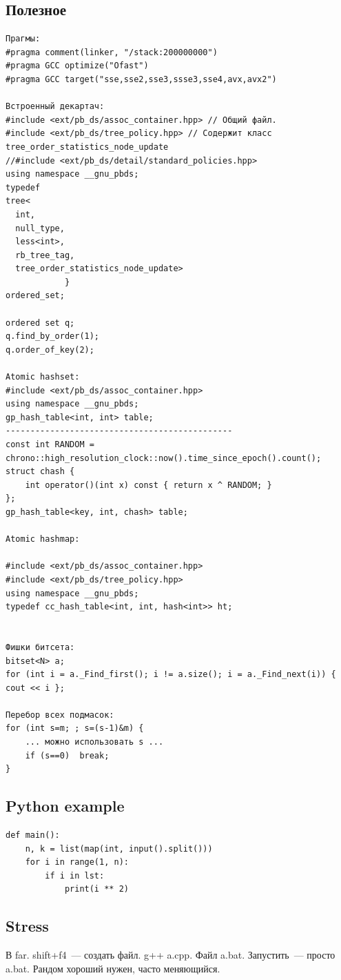 \documentclass[10pt, portrait,letterpaper]{article}
\begin{document}
\subsection{Полезное}
\begin{verbatim}
Прагмы:
#pragma comment(linker, "/stack:200000000")
#pragma GCC optimize("Ofast")
#pragma GCC target("sse,sse2,sse3,ssse3,sse4,avx,avx2")

Встроенный декартач:
#include <ext/pb_ds/assoc_container.hpp> // Общий файл. 
#include <ext/pb_ds/tree_policy.hpp> // Содержит класс tree_order_statistics_node_update
//#include <ext/pb_ds/detail/standard_policies.hpp>
using namespace __gnu_pbds;
typedef
tree<
  int,
  null_type,
  less<int>,
  rb_tree_tag,
  tree_order_statistics_node_update>
            }
ordered_set;

ordered set q;
q.find_by_order(1);
q.order_of_key(2);

Atomic hashset:
#include <ext/pb_ds/assoc_container.hpp>
using namespace __gnu_pbds;
gp_hash_table<int, int> table;
----------------------------------------------
const int RANDOM = chrono::high_resolution_clock::now().time_since_epoch().count();
struct chash {
    int operator()(int x) const { return x ^ RANDOM; }
};
gp_hash_table<key, int, chash> table;

Atomic hashmap:

#include <ext/pb_ds/assoc_container.hpp>
#include <ext/pb_ds/tree_policy.hpp>
using namespace __gnu_pbds;
typedef cc_hash_table<int, int, hash<int>> ht;


Фишки битсета:
bitset<N> a;
for (int i = a._Find_first(); i != a.size(); i = a._Find_next(i)) { cout << i };

Перебор всех подмасок:
for (int s=m; ; s=(s-1)&m) {
	... можно использовать s ...
	if (s==0)  break;
}
\end{verbatim}

\subsection{Python example}
\begin{verbatim}
def main():
    n, k = list(map(int, input().split()))
    for i in range(1, n):
        if i in lst:
            print(i ** 2)
\end{verbatim}

\subsection{Stress}
В far. shift+f4~--- создать файл. g++ a.cpp. Файл a.bat.
Запустить~--- просто a.bat. Рандом хороший нужен, часто меняющийся.
\end{document}

